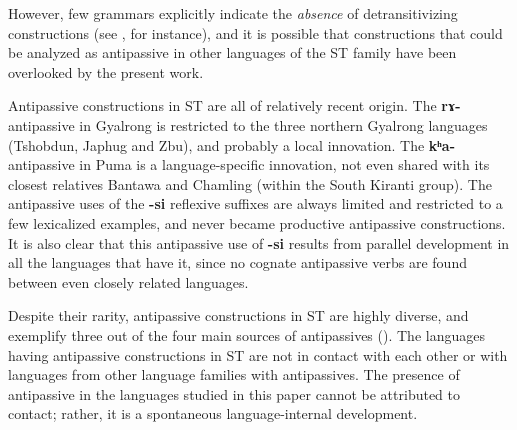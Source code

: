 \documentclass[oneside,a4paper,11pt]{article}
\newcommand{\ipa}[1]{{\phon\textbf{#1}}}
\begin{document}
However, few grammars explicitly indicate the \textit{absence} of detransitivizing constructions (see \citealt[83]{tournadre96erg}, \citealt[108]{genetti07grammar} for instance), and it is possible that constructions that could be analyzed as antipassive in other languages of the ST family have been overlooked by the present work.%

Antipassive constructions in ST are all of relatively recent origin. The \ipa{rɤ-} antipassive in Gyalrong is restricted to the three northern Gyalrong languages (Tshobdun, Japhug and Zbu), and probably a local innovation. The \ipa{kʰa-} antipassive in Puma is a language-specific innovation, not even shared with its closest relatives Bantawa and Chamling (within the South Kiranti group). The antipassive uses of the \ipa{-si} reflexive suffixes are always limited and restricted to a few lexicalized examples, and never became productive antipassive constructions. It is also clear that this antipassive use of \ipa{-si} results from parallel development in all the languages that have it, since no cognate antipassive verbs are found between even closely related languages.

Despite their rarity, antipassive constructions in ST are highly diverse, and exemplify three out of the four main sources of antipassives (\citealt{sanso17antipassive}). The languages having antipassive constructions in ST are not in contact with each other or with languages from other language families with antipassives. The presence of antipassive in the languages studied in this paper cannot be attributed to contact; rather, it is a spontaneous language-internal development.

 




 
\end{document}
